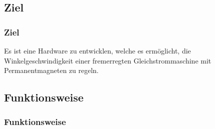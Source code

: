 \ifSTANDALONE
\subsection{Ziel}
\fi
\ifEMBED
\subsubsection{Ziel}
\fi
Es ist eine Hardware zu entwicklen, welche es ermöglicht, die
Winkelgeschwindigkeit einer fremerregten Gleichstrommaschine mit
Permanentmagneten zu regeln.

\ifSTANDALONE
\subsection{Funktionsweise}

\fi
\ifEMBED
\subsubsection{Funktionsweise}
\fi
